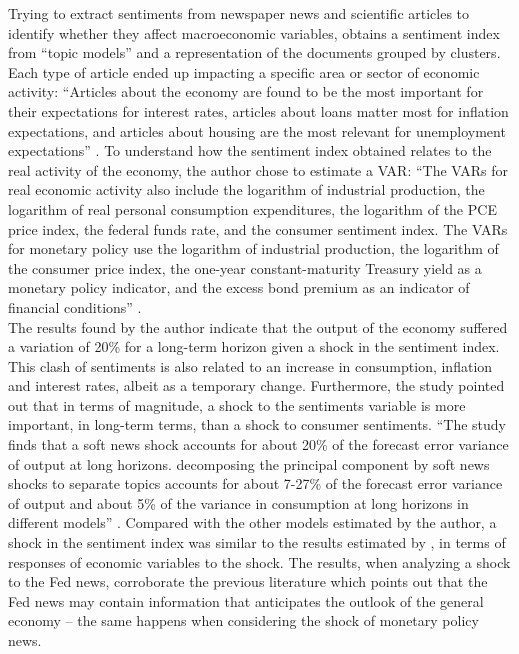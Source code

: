 Trying to extract sentiments from newspaper news and scientific articles to identify whether they affect macroeconomic variables, \cite{ostapenko2020macroeconomic} obtains a sentiment index from ``topic models'' and a representation of the documents grouped by clusters. Each type of article ended up impacting a specific area or sector of economic activity: ``Articles about the
economy are found to be the most important for their expectations for interest rates, articles about loans matter most for inflation expectations, and articles about housing are the most relevant for unemployment expectations'' \cite[p.2]{ostapenko2020macroeconomic}. To understand how the sentiment index obtained relates to the real activity of the economy, the author chose to estimate a VAR: ``The VARs for real economic activity also include the logarithm of industrial production, the logarithm of real personal consumption expenditures, the logarithm of the PCE price
index, the federal funds rate, and the consumer sentiment index. The VARs for monetary policy use the logarithm of industrial production, the logarithm of the consumer price index, the one-year constant-maturity Treasury yield as a monetary policy indicator, and the excess bond premium as an indicator of financial conditions'' \cite [p.2]{ostapenko2020macroeconomic}.\\

The results found by the author indicate that the output of the economy suffered a variation of 20\% for a long-term horizon given a shock in the sentiment index. This clash of sentiments is also related to an increase in consumption, inflation and interest rates, albeit as a temporary change. Furthermore, the study pointed out that in terms of magnitude, a shock to the sentiments variable is more important, in long-term terms, than a shock to consumer sentiments. ``The study finds that a soft news shock accounts for about 20\% of the forecast error variance of output at long horizons. decomposing the principal component by soft news shocks to separate topics accounts for about 7-27\% of the forecast error variance of output and about 5\% of the variance in consumption at long horizons in different models'' \cite[p.40]{ostapenko2020macroeconomic}. Compared with the other models estimated by the author, a shock in the sentiment index was similar to the results estimated by \cite{barsky2012information}, in terms of responses of economic variables to the shock. The results, when analyzing a shock to the Fed news, corroborate the previous literature \cite{jarocinski2020deconstructing, smith2015has} which points out that the Fed news may contain information that anticipates the outlook of the general economy -- the same happens when considering the shock of monetary policy news.\\

